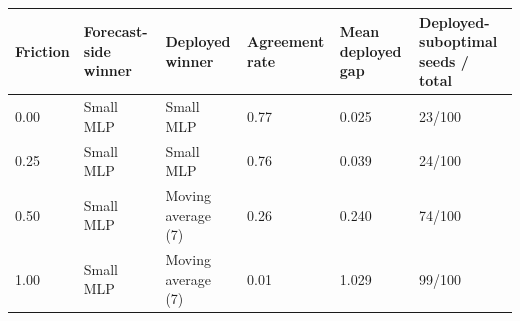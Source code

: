 \begin{tabular}{llllll}
\toprule
Friction & Forecast-side winner & Deployed winner & Agreement rate & Mean deployed gap & Deployed-suboptimal seeds / total \\
\midrule
0.00 & Small MLP & Small MLP & 0.77 & 0.025 & 23/100 \\
0.25 & Small MLP & Small MLP & 0.76 & 0.039 & 24/100 \\
0.50 & Small MLP & Moving average (7) & 0.26 & 0.240 & 74/100 \\
1.00 & Small MLP & Moving average (7) & 0.01 & 1.029 & 99/100 \\
\bottomrule
\end{tabular}
